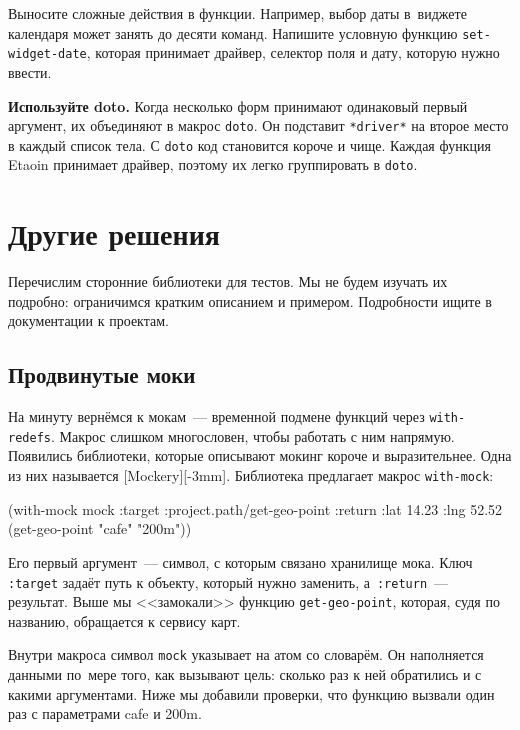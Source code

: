 Выносите сложные действия в функции. Например, выбор даты в~виджете календаря
может занять до десяти команд. Напишите условную функцию \verb|set-widget-date|,
которая принимает драйвер, селектор поля и дату, которую нужно ввести.


\textbf{Используйте doto.} Когда несколько форм принимают одинаковый первый
аргумент, их объединяют в макрос \verb|doto|. Он подставит \verb|*driver*| на
второе место в каждый список тела. С \verb|doto| код становится короче и
чище. Каждая функция Etaoin принимает драйвер, поэтому их легко группировать в
\verb|doto|.

\section{Другие решения}

Перечислим сторонние библиотеки для тестов. Мы не будем изучать их подробно:
ограничимся кратким описанием и примером. Подробности ищите в документации к
проектам.

\subsection{Продвинутые моки}


На минуту вернёмся к мокам~--- временной подмене функций через
\verb|with-redefs|. Макрос слишком многословен, чтобы работать с ним
напрямую. Появились библиотеки, которые описывают мокинг короче и
выразительнее. Одна из них называется
[Mockery][-3mm].
Библиотека предлагает макрос \verb|with-mock|:

\begin{english}
  \begin{clojure}
(with-mock mock
  {:target :project.path/get-geo-point
   :return {:lat 14.23 :lng 52.52}}
  (get-geo-point "cafe" "200m"))
  \end{clojure}
\end{english}

Его первый аргумент~--- символ, с которым связано хранилище мока. Ключ
\verb|:target| задаёт путь к объекту, который нужно заменить,
а~\verb|:return|~--- результат. Выше мы <<замокали>> функцию
\verb|get-geo-point|, которая, судя по названию, обращается к сервису карт.

Внутри макроса символ \verb|mock| указывает на атом со словарём. Он наполняется
данными по~мере того, как вызывают цель: сколько раз к ней обратились и с какими
аргументами. Ниже мы добавили проверки, что функцию вызвали один раз с
параметрами cafe и 200m.

